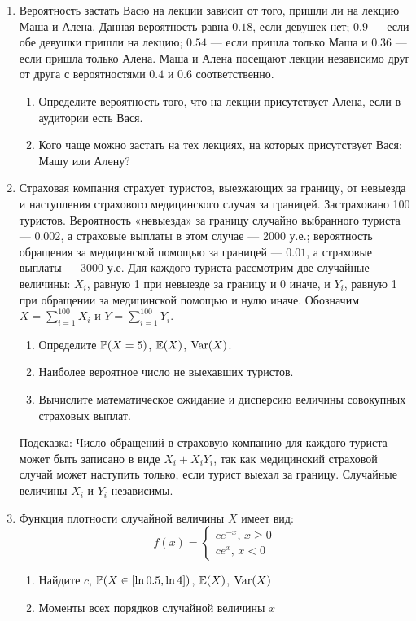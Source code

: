 \begin{enumerate}
\item Вероятность застать Васю на лекции зависит от того, пришли ли на лекцию Маша и Алена.
Данная вероятность равна $0.18$, если девушек нет; $0.9$ — если обе девушки пришли на лекцию;
$0.54$ — если пришла только Маша и $0.36$ — если пришла только Алена.
Маша и Алена посещают лекции независимо друг от друга с вероятностями $0.4$ и $0.6$ соответственно.
\begin{enumerate}
\item Определите вероятность того, что на лекции присутствует Алена, если в аудитории есть Вася.
\item Кого чаще можно застать на тех лекциях, на которых присутствует Вася: Машу или Алену?
\end{enumerate}

\item Страховая компания страхует туристов, выезжающих за границу,
от невыезда и наступления страхового медицинского случая за границей.
Застраховано 100 туристов. Вероятность «невыезда» за границу случайно
выбранного туриста — $0.002$, а страховые выплаты в этом случае — 2000 у.е.;
вероятность обращения за медицинской помощью за границей — $0.01$,
а страховые выплаты — 3000 у.е. Для каждого туриста рассмотрим две случайные
величины: $X_i$, равную 1 при невыезде за границу и 0 иначе, и $Y_i$, равную 1
при обращении за медицинской помощью и нулю иначе.
Обозначим $X=\sum_{i=1}^{100}X_i$ и $Y=\sum_{i=1}^{100}Y_i$.
\begin{enumerate}
\item Определите $\P(X=5)$, $\E(X)$, $\Var(X)$.
\item Наиболее вероятное число не выехавших туристов.
\item Вычислите математическое ожидание и дисперсию величины совокупных страховых выплат.
\end{enumerate}
Подсказка: Число обращений в страховую компанию для каждого туриста может быть
записано в виде $X_i+X_i Y_i$, так как медицинский страховой случай может наступить
только, если турист выехал за границу. Случайные величины $X_i$ и $Y_i$ независимы.

\item Функция плотности случайной величины $X$ имеет вид:
\begin{equation}
f(x)=\begin{cases}
ce^{-x}, \, x\geq 0 \\
ce^x, \, x<0
\end{cases}
\end{equation}
\begin{enumerate}
\item Найдите $c$, $\P(X \in [\ln 0.5,\ln 4])$, $\E(X)$, $\Var(X)$
\item Моменты всех порядков случайной величины $x$
\end{enumerate}


\end{enumerate}
